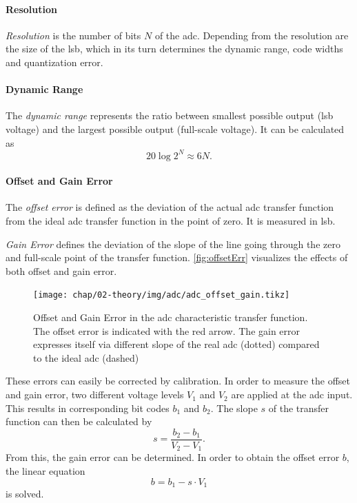\paragraph{Resolution}
\textit{Resolution} is the number of bits $N$ of the \gls{adc}.
Depending from the resolution are the size of the \gls{lsb}, which in its turn determines the dynamic range, code widths and quantization error.
\paragraph{Dynamic Range}
The \textit{dynamic range} represents the ratio between smallest possible output (\gls{lsb} voltage) and the largest possible output (full-scale voltage).
It can be calculated as
\begin{equation}
	20 \log 2^{N} \approx 6N.
\end{equation}

\paragraph{Offset and Gain Error}
The \textit{offset error} is defined as the deviation of the actual \gls{adc} transfer function from the ideal \gls{adc} transfer function in the point of zero. It is measured in \gls{lsb}. 

\textit{Gain Error} defines the deviation of the slope of the line going through the zero and full-scale point of the transfer function. %
\autoref{fig:offsetErr} visualizes the effects of both offset and gain error. 
\begin{figure}[tb]
	\centering
	\texttt{[image: chap/02-theory/img/adc/adc\_offset\_gain.tikz]}
	\caption[Effects of Offset and Fain error in ADC]{Offset and Gain Error in the \gls{adc} characteristic transfer function. The offset error is indicated with the red arrow. The gain error expresses itself via different slope of the real \gls{adc} (dotted) compared to the ideal \gls{adc} (dashed)}
	\label{fig:offsetErr}
\end{figure}

These errors can easily be corrected by calibration. 
In order to measure the offset and gain error, two different voltage levels $V_1$ and $V_2$ are applied at the \gls{adc} input. 
This results in corresponding bit codes $b_1$ and $b_2$.
The slope $s$ of the transfer function can then be calculated by
\begin{equation}
	s = \frac{b_2 - b_1}{V_2 - V_1}.
\end{equation}
From this, the gain error can be determined.
In order to obtain the offset error $b$, the linear equation
\begin{equation}
	b = b_1 - s\cdot V_1
\end{equation}
is solved.


